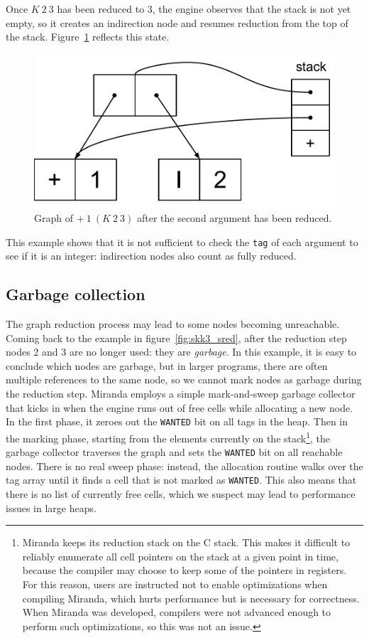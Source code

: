 \documentclass[conference]{IEEEtran}
\begin{document}
Once $K \ 2 \ 3$ has been reduced to $3$, the engine observes that the stack is not yet empty, so it creates an indirection node and resumes reduction from the top of the stack.
Figure~\ref{fig:add_step2} reflects this state.

\begin{figure}
    \includegraphics[width=.8\columnwidth]{add_step2}
    \centering
    \caption{
        Graph of $+ \ 1 \ (K \ 2 \ 3)$ after the second argument has been reduced.
    }
    \label{fig:add_step2}
\end{figure}

This example shows that it is not sufficient to check the \texttt{tag} of each argument to see if it is an integer: indirection nodes also count as fully reduced.

\subsection{Garbage collection}
\label{sec:gc}
The graph reduction process may lead to some nodes becoming unreachable.
Coming back to the example in figure~\ref{fig:skk3_sred}, after the reduction step nodes 2 and 3 are no longer used: they are \textit{garbage}.
In this example, it is easy to conclude which nodes are garbage, but in larger programs, there are often multiple references to the same node, so we cannot mark nodes as garbage during the reduction step.
Miranda employs a simple mark-and-sweep garbage collector that kicks in when the engine runs out of free cells while allocating a new node.
In the first phase, it zeroes out the \texttt{WANTED} bit on all tags in the heap.
Then in the marking phase, starting from the elements currently on the stack\footnote{
    Miranda keeps its reduction stack on the C stack.
    This makes it difficult to reliably enumerate all cell pointers on the stack at a given point in time, because the compiler may choose to keep some of the pointers in registers.
    For this reason, users are instructed not to enable optimizations when compiling Miranda, which hurts performance but is necessary for correctness.
    When Miranda was developed, compilers were not advanced enough to perform such optimizations, so this was not an issue.
}, the garbage collector traverses the graph and sets the \texttt{WANTED} bit on all reachable nodes.
There is no real sweep phase: instead, the allocation routine walks over the tag array until it finds a cell that is not marked as \texttt{WANTED}.
This also means that there is no list of currently free cells, which we suspect may lead to performance issues in large heaps.
\end{document}
